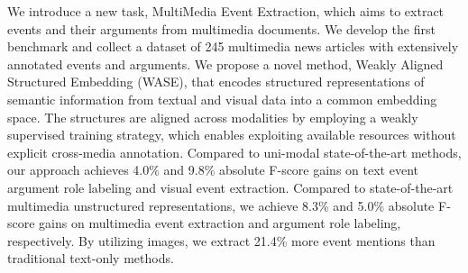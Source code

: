We introduce a new task, MultiMedia Event Extraction, which aims to extract events and their arguments from multimedia documents. We develop the first benchmark and collect a dataset of 245 multimedia news articles with extensively annotated events and arguments. We propose a novel method, Weakly Aligned Structured Embedding (WASE), that encodes structured representations of semantic information from textual and visual data into a common embedding space. The structures are aligned across modalities by employing a weakly supervised training strategy, which enables exploiting available resources without explicit cross-media annotation. Compared to uni-modal state-of-the-art methods, our approach achieves 4.0\% and 9.8\% absolute F-score gains on text event argument role labeling and visual event extraction. Compared to state-of-the-art multimedia unstructured representations, we achieve 8.3\% and 5.0\% absolute F-score gains on multimedia event extraction and argument role labeling, respectively. By utilizing images, we extract 21.4\% more event mentions than traditional text-only methods.
